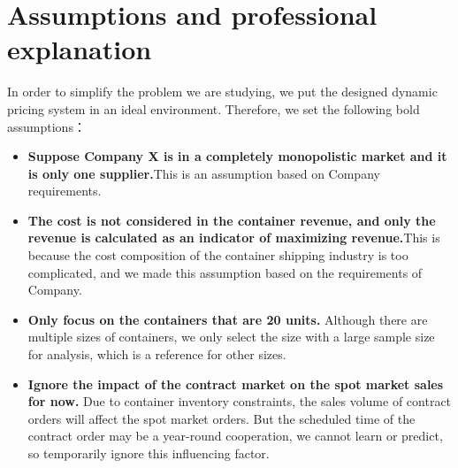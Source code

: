 \section{Assumptions and professional explanation}
In order to simplify the problem we are studying, we put the designed dynamic pricing system in an ideal environment. Therefore, we set the following bold assumptions：
\begin{itemize}                %
    \item \textbf{Suppose Company X is in a completely monopolistic market and it is only one supplier.}This is an assumption based on Company requirements.
    \item \textbf{The cost is not considered in the container revenue, and only the revenue is calculated as an indicator of maximizing revenue.}This is because the cost composition of the container shipping industry is too complicated, and we made this assumption based on the requirements of Company.
    \item \textbf{Only focus on the containers that are 20 units.} Although there are multiple sizes of containers, we only select the size with a large sample size for analysis, which is a reference for other sizes.
    \item \textbf{Ignore the impact of the contract market on the spot market sales for now.} Due to container inventory constraints, the sales volume of contract orders will affect the spot market orders. But the scheduled time of the contract order may be a year-round cooperation, we cannot learn or predict, so temporarily ignore this influencing factor.
\end{itemize}

